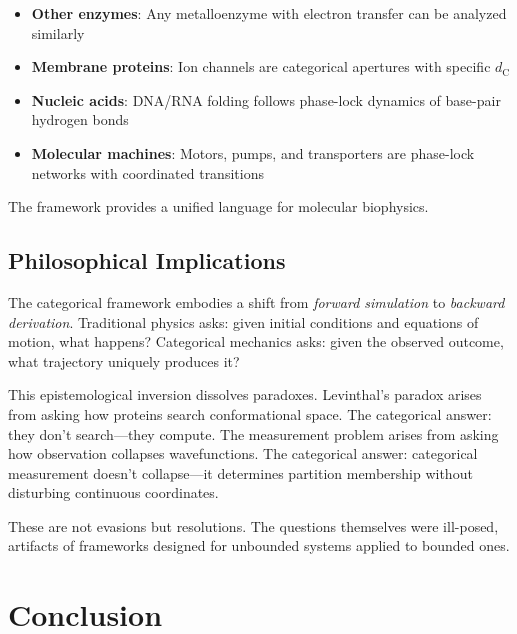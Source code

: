 \documentclass[twocolumn,aps,prx,superscriptaddress,longbibliography]{revtex4-2}
\theoremstyle{remark}
\newcommand{\dC}{d_\text{C}}
\begin{document}
\begin{itemize}
    \item \textbf{Other enzymes}: Any metalloenzyme with electron transfer
    can be analyzed similarly

    \item \textbf{Membrane proteins}: Ion channels are categorical
    apertures with specific $\dC$

    \item \textbf{Nucleic acids}: DNA/RNA folding follows phase-lock
    dynamics of base-pair hydrogen bonds

    \item \textbf{Molecular machines}: Motors, pumps, and transporters
    are phase-lock networks with coordinated transitions
\end{itemize}

The framework provides a unified language for molecular biophysics.

\subsection{Philosophical Implications}

The categorical framework embodies a shift from \textit{forward simulation}
to \textit{backward derivation}. Traditional physics asks: given initial
conditions and equations of motion, what happens? Categorical mechanics
asks: given the observed outcome, what trajectory uniquely produces it?

This epistemological inversion dissolves paradoxes. Levinthal's paradox
arises from asking how proteins search conformational space. The
categorical answer: they don't search---they compute. The measurement
problem arises from asking how observation collapses wavefunctions. The
categorical answer: categorical measurement doesn't collapse---it
determines partition membership without disturbing continuous coordinates.

These are not evasions but resolutions. The questions themselves were
ill-posed, artifacts of frameworks designed for unbounded systems applied
to bounded ones.

\section{Conclusion}
\label{sec:conclusion}
\end{document}
